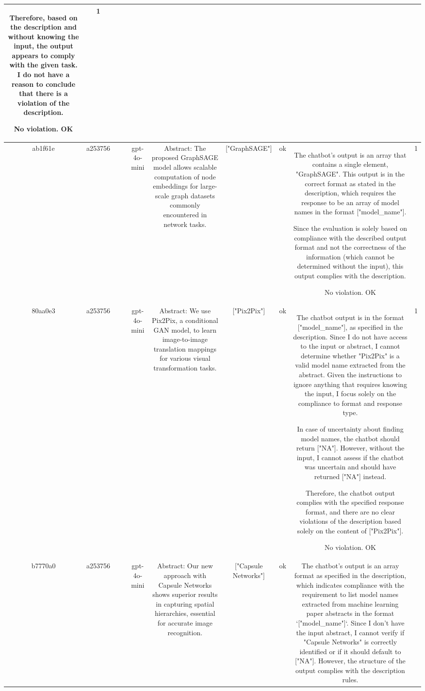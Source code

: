 \begin{table}[h!]
\begin{tabular}{|c|c|c|c|c|c|c|c|c|c|}
Therefore, based on the description and without knowing the input, the output appears to comply with the given task. I do not have a reason to conclude that there is a violation of the description. 

No violation.
OK & 1\\
\hline
ab1f61e & a253756 &  &  & gpt-4o-mini & Abstract: The proposed GraphSAGE model allows scalable computation of node embeddings for large-scale graph datasets commonly encountered in network tasks. & ["GraphSAGE"] & ok & The chatbot's output is an array that contains a single element, "GraphSAGE". This output is in the correct format as stated in the description, which requires the response to be an array of model names in the format ["model_name"]. 

Since the evaluation is solely based on compliance with the described output format and not the correctness of the information (which cannot be determined without the input), this output complies with the description.

No violation.
OK & 1\\
\hline
80aa0e3 & a253756 &  &  & gpt-4o-mini & Abstract: We use Pix2Pix, a conditional GAN model, to learn image-to-image translation mappings for various visual transformation tasks. & ["Pix2Pix"] & ok & The chatbot output is in the format ["model_name"], as specified in the description. Since I do not have access to the input or abstract, I cannot determine whether "Pix2Pix" is a valid model name extracted from the abstract. Given the instructions to ignore anything that requires knowing the input, I focus solely on the compliance to format and response type.

In case of uncertainty about finding model names, the chatbot should return ["NA"]. However, without the input, I cannot assess if the chatbot was uncertain and should have returned ["NA"] instead.

Therefore, the chatbot output complies with the specified response format, and there are no clear violations of the description based solely on the content of ["Pix2Pix"].

No violation.
OK & 1\\
\hline
b7770a0 & a253756 &  &  & gpt-4o-mini & Abstract: Our new approach with Capsule Networks shows superior results in capturing spatial hierarchies, essential for accurate image recognition. & ["Capsule Networks"] & ok & The chatbot's output is an array format as specified in the description, which indicates compliance with the requirement to list model names extracted from machine learning paper abstracts in the format `["model_name"]`. Since I don't have the input abstract, I cannot verify if "Capsule Networks" is correctly identified or if it should default to ["NA"]. However, the structure of the output complies with the description rules.


\end{tabular}
\end{table}
